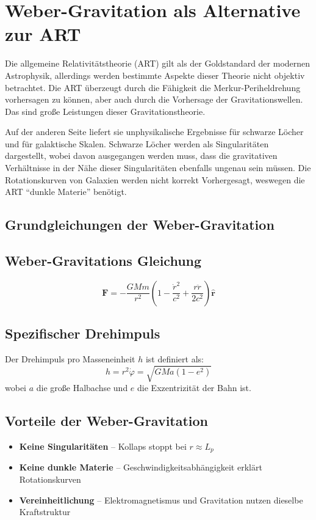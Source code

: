 \newpage
\section{Weber-Gravitation als Alternative zur ART}
Die allgemeine Relativitätstheorie (ART) gilt als der Goldstandard der modernen Astrophysik, allerdings werden bestimmte Aspekte dieser Theorie
nicht objektiv betrachtet. Die ART überzeugt durch die Fähigkeit die Merkur-Periheldrehung vorhersagen zu können, aber auch durch die Vorhersage
der Gravitationswellen. Das sind große Leistungen dieser Gravitationstheorie.

Auf der anderen Seite liefert sie unphysikalische Ergebnisse für schwarze Löcher und für galaktische Skalen. Schwarze Löcher werden als Singularitäten
dargestellt, wobei davon ausgegangen werden muss, dass die gravitativen Verhältnisse in der Nähe dieser Singularitäten ebenfalls ungenau sein müssen. Die
Rotationskurven von Galaxien werden nicht korrekt Vorhergesagt, weswegen die ART \enquote{dunkle Materie} benötigt.

\subsection{Grundgleichungen der Weber-Gravitation}
\subsection*{Weber-Gravitations Gleichung}
\begin{equation}\label{eq:weber_gravitationskraft}
\mathbf{F} = -\frac{GMm}{r^2}\left(1 - \frac{\dot{r}^2}{c^2} + \frac{r\ddot{r}}{2c^2}\right)\mathbf{\hat{r}}
\end{equation}

\subsection*{Spezifischer Drehimpuls}
Der Drehimpuls pro Masseneinheit $h$ ist definiert als:
\begin{equation}
h = r^2\dot{\varphi} = \sqrt{GMa(1-e^2)}
\end{equation}
wobei $a$ die große Halbachse und $e$ die Exzentrizität der Bahn ist.

\subsection{Vorteile der Weber-Gravitation}
\begin{itemize}
\item \textbf{Keine Singularitäten} – Kollaps stoppt bei $r \approx L_p$
\item \textbf{Keine dunkle Materie} – Geschwindigkeitsabhängigkeit erklärt Rotationskurven
\item \textbf{Vereinheitlichung} – Elektromagnetismus und Gravitation nutzen dieselbe Kraftstruktur
\end{itemize}

